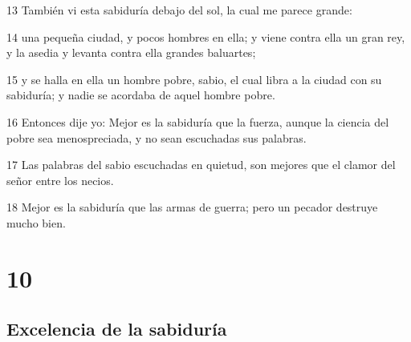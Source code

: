 \par 13 También vi esta sabiduría debajo del sol, la cual me parece grande:
\par 14 una pequeña ciudad, y pocos hombres en ella; y viene contra ella un gran rey, y la asedia y levanta contra ella grandes baluartes;
\par 15 y se halla en ella un hombre pobre, sabio, el cual libra a la ciudad con su sabiduría; y nadie se acordaba de aquel hombre pobre.
\par 16 Entonces dije yo: Mejor es la sabiduría que la fuerza, aunque la ciencia del pobre sea menospreciada, y no sean escuchadas sus palabras.
\par 17 Las palabras del sabio escuchadas en quietud, son mejores que el clamor del señor entre los necios.
\par 18 Mejor es la sabiduría que las armas de guerra; pero un pecador destruye mucho bien.

\chapter{10}

\section*{Excelencia de la sabiduría}

